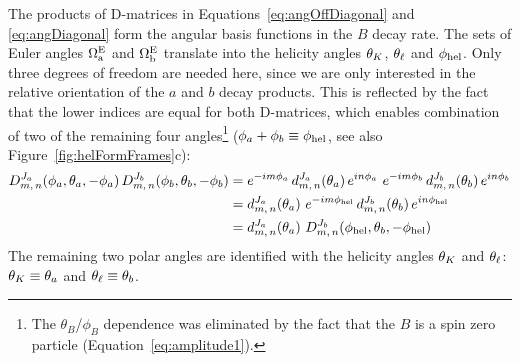 The products of D-matrices in Equations~\ref{eq:angOffDiagonal} and \ref{eq:angDiagonal} form the
angular basis functions in the $B$ decay rate. The sets of Euler angles $\EulSet[a]$ and
$\EulSet[b]$ translate into the helicity angles $\thetak$, $\thetal$ and $\phihel$. Only three
degrees of freedom are needed here, since we are only interested in the relative orientation of the
$a$ and $b$ decay products. This is reflected by the fact that the lower indices are equal for both
D-matrices, which enables combination of two of the remaining four angles\footnote{The
$\theta_B$/$\phi_B$ dependence was eliminated by the fact that the $B$ is a spin zero particle
(Equation~\ref{eq:amplitude1}).} ($\phi_a+\phi_b\equiv\phihel$, see also
Figure~\ref{fig:helFormFrames}c):
\begin{equation}\begin{split}
  D_{m,\,n}^{J_a}(\phi_a,\theta_a,-\phi_a)\, D_{m,\,n}^{J_b}(\phi_b,\theta_b,-\phi_b)
    &= e^{-im\phi_a}\, d_{m,\,n}^{J_a}(\theta_a)\, e^{in\phi_a}\
       e^{-im\phi_b}\, d_{m,\,n}^{J_b}(\theta_b)\, e^{in\phi_b} \\
    &= d_{m,\,n}^{J_a}(\theta_a)\ e^{-im\phihel}\, d_{m,\,n}^{J_b}(\theta_b)\, e^{in\phihel} \\
    &= d_{m,\,n}^{J_a}(\theta_a)\ D_{m,\,n}^{J_b}(\phihel,\theta_b,-\phihel)
\end{split}\end{equation}
The remaining two polar angles are identified with the helicity angles $\thetak$ and $\thetal$:
$\thetak\equiv\theta_a$ and $\thetal\equiv\theta_b$.

